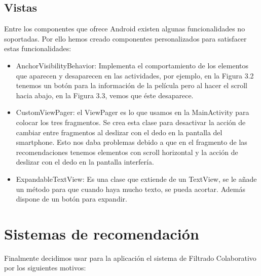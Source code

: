 \subsection{Vistas}
\label{makereference4.3.7}
Entre los componentes que ofrece Android existen algunas funcionalidades no soportadas. Por ello hemos creado componentes personalizados para satisfacer estas funcionalidades:
\begin{itemize}
    \item AnchorVisibilityBehavior: Implementa el comportamiento de los elementos que aparecen y desaparecen en las actividades, por ejemplo, en la Figura 3.2 tenemos un botón para la información de la película pero al hacer el scroll hacia abajo, en la Figura 3.3, vemos que éste desaparece.
    \item CustomViewPager: el ViewPager es lo que usamos en la MainActivity para colocar los tres fragmentos. Se crea esta clase para desactivar la acción de cambiar entre fragmentos al deslizar con el dedo en la pantalla del smartphone. Esto nos daba problemas debido a que en el fragmento de las recomendaciones tenemos elementos con scroll horizontal y la acción de deslizar con el dedo en la pantalla interfería.
    \item ExpandableTextView: Es una clase que extiende de un TextView, se le añade un método para que cuando haya mucho texto, se pueda acortar. Además dispone de un botón para expandir.
\end{itemize} 
\section{Sistemas de recomendación}
\label{makereference4.4}
Finalmente decidimos usar para la aplicación el sistema de Filtrado Colaborativo por los siguientes motivos:

